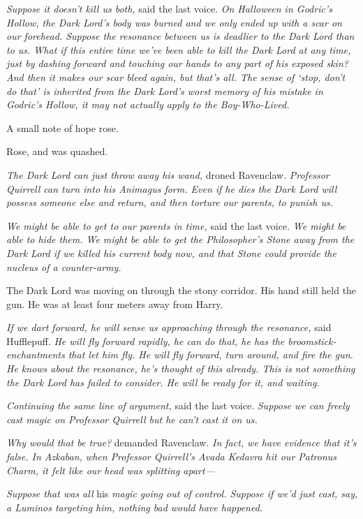 \emph{Suppose it doesn't kill us both,} said the last voice. \emph{On Halloween
in Godric's Hollow, the Dark Lord's body was burned and we only ended up with a
scar on our forehead. Suppose the resonance between us is deadlier to the Dark
Lord than to us. What if this entire time we've been able to kill the Dark Lord
at any time, just by dashing forward and touching our hands to any part of his
exposed skin? And then it makes our scar bleed again, but that's all. The sense
of `stop, don't do that' is inherited from the Dark Lord's worst memory of his
mistake in Godric's Hollow, it may not actually apply to the Boy-Who-Lived.}

A small note of hope rose.

Rose, and was quashed.

\emph{The Dark Lord can just throw away his wand,} droned Ravenclaw.
\emph{Professor Quirrell can turn into his Animagus form. Even if he dies the
Dark Lord will possess someone else and return, and then torture our parents,
to punish us.}

\emph{We might be able to get to our parents in time,} said the last voice.
\emph{We might be able to hide them. We might be able to get the Philosopher's
Stone away from the Dark Lord if we killed his current body now, and that Stone
could provide the nucleus of a counter-army.}

The Dark Lord was moving on through the stony corridor. His hand still held the
gun. He was at least four meters away from Harry.

\emph{If we dart forward, he will sense us approaching through the resonance,}
said Hufflepuff. \emph{He will fly forward rapidly, he can do that, he has the
broomstick-enchantments that let him fly. He will fly forward, turn around, and
fire the gun. He knows about the resonance, he's thought of this already. This
is not something the Dark Lord has failed to consider. He will be ready for it,
and waiting.}

\emph{Continuing the same line of argument,} said the last voice. \emph{Suppose
we can freely cast magic on Professor Quirrell but he can't cast it on us.}

\emph{Why would that be true?} demanded Ravenclaw. \emph{In fact, we have
evidence that it's false. In Azkaban, when Professor Quirrell's Avada Kedavra
hit our Patronus Charm, it felt like our head was splitting apart---}

\emph{Suppose that was all} his \emph{magic going out of control. Suppose if
we'd just cast, say, a Luminos targeting him, nothing bad would have happened.}

